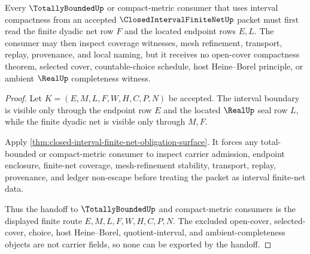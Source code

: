 \begin{theorem}
\label{thm:closed-interval-finite-net-total-bounded-handoff}
Every $\TotallyBoundedUp$ or compact-metric consumer that uses interval compactness from an accepted $\ClosedIntervalFiniteNetUp$ packet must first read the finite dyadic net row $F$ and the located endpoint rows $E,L$. The consumer may then inspect coverage witnesses, mesh refinement, transport, replay, provenance, and local naming, but it receives no open-cover compactness theorem, selected cover, countable-choice schedule, host Heine--Borel principle, or ambient $\RealUp$ completeness witness.
\end{theorem}
\begin{proof}
Let $K=(E,M,L,F,W,H,C,P,N)$ be accepted. The interval boundary is visible only through the endpoint row $E$ and the located $\RealUp$ seal row $L$, while the finite dyadic net is visible only through $M,F$.

Apply \autoref{thm:closed-interval-finite-net-obligation-surface}. It forces any total-bounded or compact-metric consumer to inspect carrier admission, endpoint enclosure, finite-net coverage, mesh-refinement stability, transport, replay, provenance, and ledger non-escape before treating the packet as interval finite-net data.

Thus the handoff to $\TotallyBoundedUp$ and compact-metric consumers is the displayed finite route $E,M,L,F,W,H,C,P,N$. The excluded open-cover, selected-cover, choice, host Heine--Borel, quotient-interval, and ambient-completeness objects are not carrier fields, so none can be exported by the handoff.
\end{proof}



